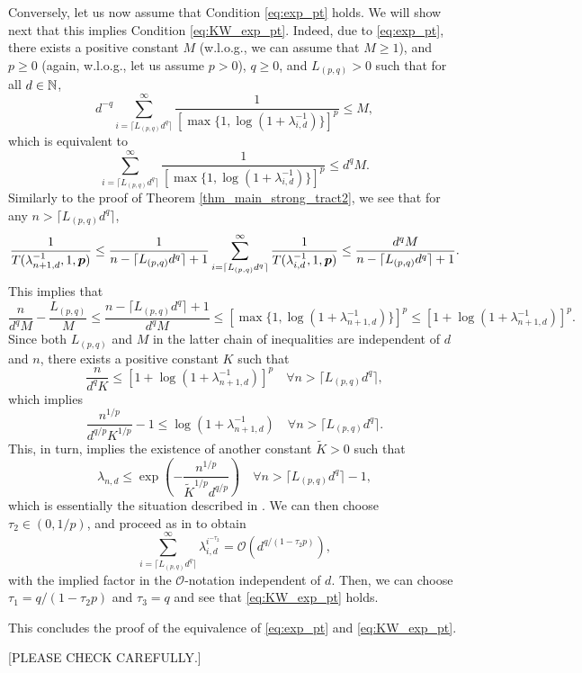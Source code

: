\documentclass[sort&compress]{elsarticle}
\begin{document}
{Conversely, let us now assume that Condition \eqref{eq:exp_pt} holds. We will show next that this implies Condition \eqref{eq:KW_exp_pt}. Indeed, due to \eqref{eq:exp_pt}, there exists a positive constant $M$ (w.l.o.g., we can assume that $M\ge 1$), and $p\ge 0$ (again, w.l.o.g., let us assume $p>0$), $q\ge 0$, and $L_{(p,q)}>0$ such that for all $d\in\mathbb{N}$,
\[
d^{-q}
\sum_{i=\lceil L_{(p,q)} d^{q}\rceil}^\infty \frac{1}{[\max\{1,\log(1+\lambda_{i,d}^{-1})\}]^p} \le M,
\]
which is equivalent to
\[
\sum_{i=\lceil L_{(p,q)} d^{q}\rceil}^\infty \frac{1}{[\max\{1,\log(1+\lambda_{i,d}^{-1})\}]^p} \le d^q M.
\]
Similarly to the proof of Theorem \ref{thm_main_strong_tract2}, we see that for any $n > \lceil L_{(p,q)} d^{q}\rceil $,
\[
\frac{1}{T(\lambda_{n+1,d}^{-1},1,\boldsymbol{p})} \le \frac{1}{n-\lceil L_{(p,q)} d^{q}\rceil +1 }
\sum_{i=\lceil L_{(p,q)} d^{q}\rceil}^\infty  \frac{1}{T(\lambda_{i,d}^{-1},1,\boldsymbol{p})}
\le \frac{d^q M}{n-\lceil L_{(p,q)} d^{q}\rceil +1 }.
\]
This implies that
\[
\frac{n}{d^q M}-\frac{L_{(p,q)}}{M}\le\frac{n-\lceil L_{(p,q)} d^{q}\rceil +1 }{d^q M} \le [\max\{1,\log(1+\lambda_{n+1,d}^{-1})\}]^p
\le [1 + \log(1+\lambda_{n+1,d}^{-1})]^p.
\]
Since both $L_{(p,q)}$ and $M$ in the latter chain of inequalities are independent of $d$ and $n$, there
exists a positive constant $K$ such that
\[
\frac{n}{d^q K} \le [1 + \log(1+\lambda_{n+1,d}^{-1})]^p\quad \forall n > \lceil L_{(p,q)} d^{q}\rceil,
\]
which implies
\[
\frac{n^{1/p}}{d^{q/p} K^{1/p}} -1 \le \log(1+\lambda_{n+1,d}^{-1})\quad \forall n > \lceil L_{(p,q)} d^{q}\rceil.
\]
This, in turn, implies the existence of another constant $\widetilde{K}>0$ such that
\[
\lambda_{n,d} \le \exp\left(-\frac{n^{1/p}}{\widetilde{K}^{1/p} d^{q/p}}\right)
\quad \forall n > \lceil L_{(p,q)} d^{q}\rceil-1,
\]
which is essentially the situation described in \cite[p.~118]{KriWoz19a}. We can then choose $\tau_2\in (0,1/p)$,
and proceed as in \cite{KriWoz19a} to obtain
\[
\sum_{i=\lceil L_{(p,q)} d^{q}\rceil}^\infty \lambda_{i,d}^{i^{-\tau_2}}=\mathcal{O}(d^{q/(1-\tau_2 p)}),
\]
with the implied factor in the $\mathcal{O}$-notation independent of $d$. Then, we can choose $\tau_1=q/(1-\tau_2 p)$ and $\tau_3=q$ and see that \eqref{eq:KW_exp_pt} holds.

This concludes the proof of the equivalence of \eqref{eq:exp_pt} and \eqref{eq:KW_exp_pt}.

\bigskip

[PLEASE CHECK CAREFULLY.]}
\end{document}
